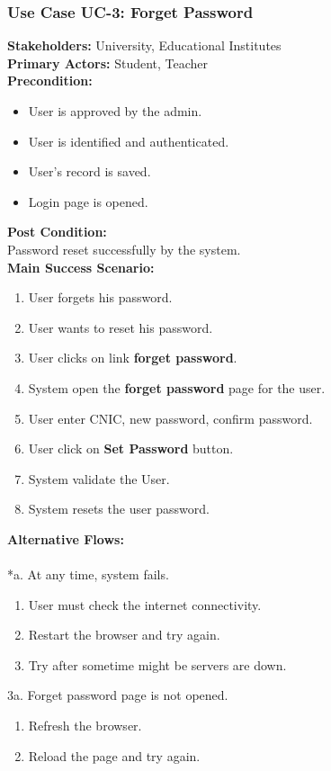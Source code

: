 \documentclass[12pt]{article}
\begin{document}
\subsubsection{Use Case UC-3: Forget Password}
\textbf{Stakeholders: } University, Educational Institutes \\
\textbf{Primary Actors: } Student, Teacher \\
\textbf{Precondition:}\begin{itemize}
\item User is approved by the admin.
\item User is identified and authenticated.
\item User's record is saved.
\item Login page is opened.
\end{itemize}
\textbf{Post Condition: }\\
Password reset successfully by the system.\\
\textbf{Main Success Scenario:}
\begin{enumerate}
\item User forgets his password.
\item User wants to reset his password.
\item User clicks on link \textbf{forget password}.
\item System open the \textbf{forget password} page for the user.
\item User enter CNIC, new password, confirm password.
\item User click on \textbf{Set Password} button.
\item System validate the User.
\item System resets the user password.
\end{enumerate}
\textbf{Alternative Flows:}\\\\
*a. At any time, system fails.
\begin{enumerate}
\item User must check the internet connectivity.
\item Restart the browser and try again.
\item Try after sometime might be servers are down.
\end{enumerate}
3a. Forget password page is not opened.
\begin{enumerate}
\item Refresh the browser.
\item Reload the page and try again.
\end{enumerate}
\end{document}
